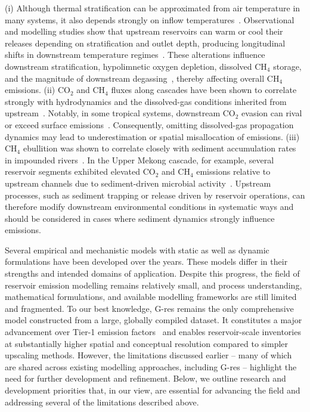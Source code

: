 \documentclass[10pt]{article}
\begin{document}
(i) Although thermal stratification can be approximated from air temperature in many systems, it also depends strongly on inflow temperatures~\citep{Deemer2016}. Observational and modelling studies show that upstream reservoirs can warm or cool their releases depending on stratification and outlet depth, producing longitudinal shifts in downstream temperature regimes~\citep{Long2019_Jinsha, Almeida2022_temperatures, He2025a}. These alterations influence downstream stratification, hypolimnetic oxygen depletion, dissolved CH$_4$ storage, and the magnitude of downstream degassing~\citep{Deemer2016}, thereby affecting overall CH$_4$ emissions.
(ii) CO$_2$ and CH$_4$ fluxes along cascades have been shown to correlate strongly with hydrodynamics and the dissolved-gas conditions inherited from upstream~\citep{Soued2020exp, Wang_2021, SHI2023}. Notably, in some tropical systems, downstream CO$_2$ evasion can rival or exceed surface emissions~\citep{Calamita2021}. Consequently, omitting dissolved-gas propagation dynamics may lead to underestimation or spatial misallocation of emissions.
(iii) CH$_4$ ebullition was shown to correlate closely with sediment accumulation rates in impounded rivers~\citep{Maeck2013}. In the Upper Mekong cascade, for example, several reservoir segments exhibited elevated CO$_2$ and CH$_4$ emissions relative to upstream channels due to sediment-driven microbial activity~\citep{SHI2023}. Upstream processes, such as sediment trapping or release driven by reservoir operations, can therefore modify downstream environmental conditions in systematic ways and should be considered in cases where sediment dynamics strongly influence emissions.

Several empirical and mechanistic models with static as well as dynamic formulations have been developed over the years. 
These models differ in their strengths and intended domains of application.
Despite this progress, the field of reservoir emission modelling remains relatively small, and process understanding, mathematical formulations, and available modelling frameworks are still limited and fragmented.
To our best knowledge, G-res remains the only comprehensive model constructed from a large, globally compiled dataset.
It constitutes a major advancement over Tier-1 emission factors~\cite{janus2025planning} and enables reservoir-scale inventories at substantially higher spatial and conceptual resolution compared to simpler upscaling methods.
However, the limitations discussed earlier -- many of which are shared across existing modelling approaches, including G-res -- highlight the need for further development and refinement.
Below, we outline research and development priorities that, in our view, are essential for advancing the field and addressing several of the limitations described above.
\end{document}
